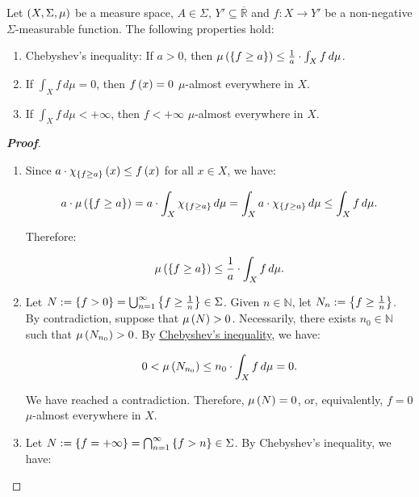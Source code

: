 \begin{proposition}
  Let $\left(X,\Sigma,\mu\right)$ be a measure space, $A\in\Sigma$, $Y'\subseteq\overline{\mathbb{R}}$ and $f:X\rightarrow Y'$ be a non-negative $\Sigma$-measurable function. The following properties hold:

  \begin{enumerate}
    \item Chebyshev's inequality: If $a>0$, then $\mu\left(\left\{f\geq a\right\}\right)\leq\frac{1}{a}\cdot\int_{X}{f\,d\mu}$.\label{Chebyshev's inequality}
    \item If $\int_{X}{f\,d\mu}=0$, then $f\left(x\right)=0$ $\mu$-almost everywhere in $X$.
    \item If $\int_{X}{f\,d\mu}<+\infty$, then $f<+\infty$ $\mu$-almost everywhere in $X$.
  \end{enumerate}
  \begin{proof}[\rm\textbf{Proof}]
    \hfill
    \begin{enumerate}
      \item Since $a\cdot\chi_{\left\{f\geq a\right\}}\left(x\right)\leq f\left(x\right)$ for all $x\in X$, we have:
      
      \begin{equation}
        a\cdot\mu\left(\left\{f\geq a\right\}\right)=a\cdot\int_{X}{\chi_{\left\{f\geq a\right\}}\,d\mu}=\int_{X}{a\cdot\chi_{\left\{f\geq a\right\}}\,d\mu}\leq\int_{X}{f\,d\mu}.
      \end{equation}

      Therefore:

      \begin{equation}
        \mu\left(\left\{f\geq a\right\}\right)\leq\frac{1}{a}\cdot\int_{X}{f\,d\mu}.
      \end{equation}
      \item Let $N:=\left\{f>0\right\}=\bigcup_{n=1}^{\infty}{\left\{f\geq\frac{1}{n}\right\}}\in\Sigma$. Given $n\in\mathbb{N}$, let $N_n:=\left\{f\geq\frac{1}{n}\right\}$. By contradiction, suppose that $\mu\left(N\right)>0$. Necessarily, there exists $n_0\in\mathbb{N}$ such that $\mu\left(N_{n_0}\right)>0$. By \hyperref[Chebyshev's inequality]{Chebyshev's inequality}, we have:
      
      \begin{equation}
        0<\mu\left(N_{n_0}\right)\leq n_0\cdot\int_{X}{f\,d\mu}=0.
      \end{equation}

      We have reached a contradiction. Therefore, $\mu\left(N\right)=0$, or, equivalently, $f=0$ $\mu$-almost everywhere in $X$.
      \item Let $N:=\left\{f=+\infty\right\}=\bigcap_{n=1}^{\infty}{\left\{f>n\right\}}\in\Sigma$. By Chebyshev's inequality, we have:
      

\end{enumerate}
\end{proof}
\end{proposition}

